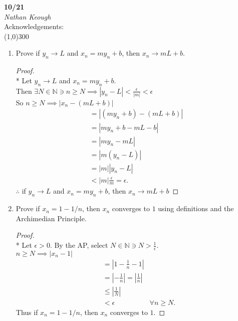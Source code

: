 \documentclass[a4paper]{article}
\newcommand{\nat}{\mathbb{N}}
\begin{document}
    \begin{center}
        \Large \textbf{10/21} \\
        \large \textit{Nathan Keough} \\
        Acknowledgements: \emph{} \vspace{.5pc} \\ \line(1,0){300} 
        \vspace{1pc}
    \end{center} 
    
    \begin{flushleft}


        

        \begin{enumerate}[1.]
            \item Prove if $y_n\to L$ and $x_n=my_n+b$, then $x_n\to mL+b$.
            
            \begin{proof}\mbox{}\\*
            Let $y_n\to L$ and $x_n=my_n+b$. \\
            Then $\exists N \in \nat \ni n \geq N \implies |y_n - L| < \frac{\epsilon}{|m|} < \epsilon$ \\
            So $n \geq N \implies |x_n - (mL + b)|$ 
            \begin{align*}
                &= |(my_n + b)-(mL + b)| & \\
                &= |my_n + b-mL - b| & \\
                &= |my_n-mL| & \\
                &= |m(y_n-L)| & \\
                &= |m||y_n - L| & \\
                &< |m|\frac{\epsilon}{m} = \epsilon.
            \end{align*}
            $\therefore$ if $y_n\to L$ and $x_n=my_n+b$, then $x_n\to mL+b$
            \end{proof}


            \item Prove if $x_n=1-1/n$, then $x_n$ converges to $1$ using definitions and the Archimedian Principle.
            \begin{proof}\mbox{}\\*
            Let $\epsilon > 0$. By the AP, select $N \in \nat \ni N > \frac{1}{\epsilon}$. \\
            $n \geq N \implies |x_n - 1|$
            \begin{align*}
                &= |1 - \frac{1}{n} - 1| & \\
                &= |- \frac{1}{n}| = | \frac{1}{n}| & \\
                &\leq | \frac{1}{N}| & \\
                &< \epsilon & \forall n\geq N.
            \end{align*}
            Thus if $x_n=1-1/n$, then $x_n$ converges to $1$.
            \end{proof}
        \end{enumerate} 

    \end{flushleft}
\end{document}
